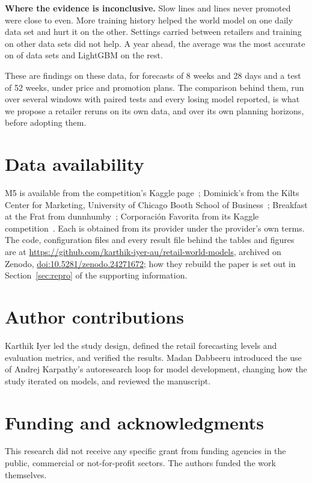 \textbf{Where the evidence is inconclusive.} Slow lines and lines never promoted were close to
even. More training history helped the world model on one daily data set and hurt it on the
other. Settings carried between retailers and training on other data sets did not help. A year
ahead, the average was the most accurate on \lhLowestAvgDirect{} of \lhSets{} data sets and LightGBM
on the rest.

These are findings on these data, for forecasts of 8 weeks and 28 days and a test of 52 weeks,
under price and promotion plans. The comparison behind them, run over several windows with paired
tests and every losing model reported, is what we propose a retailer reruns on its own data, and
over its own planning horizons, before adopting them.

\ifjournal\else

\fi

\ifjof
\section{Data availability}
\label{sec:licence}
M5 is available from the competition's Kaggle page~\cite{m5accuracy};
Dominick's from the Kilts Center for Marketing, University of Chicago Booth
School of Business~\cite{dominicks}; Breakfast at the Frat from
dunnhumby~\cite{frat}; Corporaci\'on Favorita from its Kaggle
competition~\cite{favorita}. Each is obtained from its provider under the
provider's own terms. The code, configuration files and every result file behind
the tables and figures are at
\url{https://github.com/karthik-iyer-au/retail-world-models}, archived on Zenodo,
\href{https://doi.org/10.5281/zenodo.24271672}{doi:10.5281/zenodo.24271672}; how
they rebuild the paper is set out in Section~\ref{sec:repro} of the supporting
information.

\section{Author contributions}
\label{sec:contributions}
Karthik Iyer led the study design, defined the retail forecasting levels and
evaluation metrics, and verified the results. Madan Dabbeeru introduced the use of
Andrej Karpathy's autoresearch loop for model development, changing how the study
iterated on models, and reviewed the manuscript.

\section{Funding and acknowledgments}
This research did not receive any specific grant from funding agencies in the
public, commercial or not-for-profit sectors. The authors funded the work
themselves.

